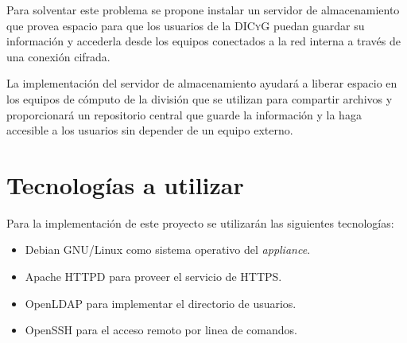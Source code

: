 Para solventar este problema se propone instalar un servidor de almacenamiento que provea espacio para que los usuarios de la \textsc{DICyG} puedan guardar su informaci\'{o}n y accederla desde los equipos conectados a la red interna a trav\'{e}s de una conexi\'{o}n cifrada.

La implementaci\'{o}n del servidor de almacenamiento ayudar\'{a} a liberar espacio en los equipos de c\'{o}mputo de la divisi\'{o}n que se utilizan para compartir archivos y proporcionar\'{a} un repositorio central que guarde la informaci\'{o}n y la haga accesible a los usuarios sin depender de un equipo externo.


    \section {Tecnolog\'{i}as a utilizar}

Para la implementaci\'{o}n de este proyecto se utilizar\'{a}n las siguientes tecnolog\'{i}as:

\begin{itemize}
  \item Debian GNU/Linux como sistema operativo del \textit{appliance}.
  \item Apache HTTPD para proveer el servicio de HTTPS.
  \item OpenLDAP para implementar el directorio de usuarios.
  \item OpenSSH para el acceso remoto por linea de comandos.
\end{itemize}

